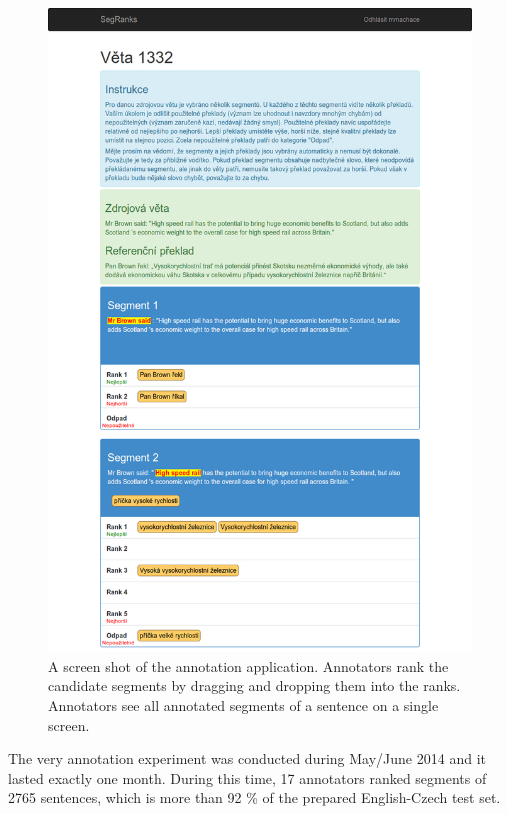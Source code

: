 \begin{figure}
    \begin{center}
        \includegraphics[width=\textwidth]{img/segranks-screenshot2.png}
    \end{center}
    \caption[A screen shot of the annotation application]{A screen shot of the
    annotation application. Annotators rank the candidate segments by dragging
and dropping them into the ranks.  Annotators see all annotated segments of a
sentence on a single screen.}
    \label{segranks-screenshot}
\end{figure}

The very annotation experiment was conducted during May/June 2014 and it lasted
exactly one month. During this time, 17 annotators ranked segments of 2765
sentences, which is more than 92 \% of the prepared English-Czech test set.

